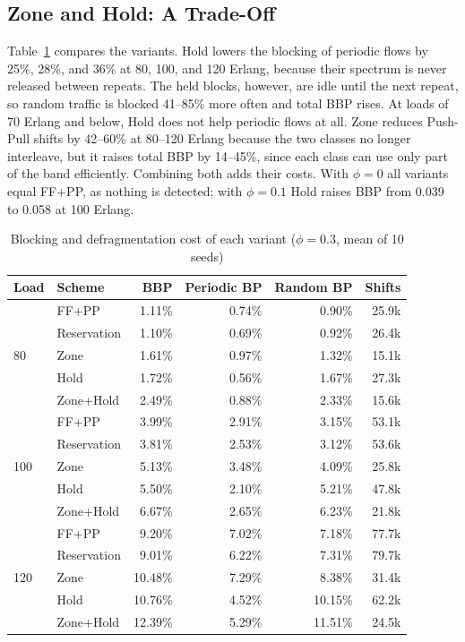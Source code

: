 \documentclass[conference]{IEEEtran}
\begin{document}
\subsection{Zone and Hold: A Trade-Off}
Table~\ref{tab:variants} compares the variants. Hold lowers the blocking of periodic flows by 25\%, 28\%, and 36\% at 80, 100, and 120 Erlang, because their spectrum is never released between repeats. The held blocks, however, are idle until the next repeat, so random traffic is blocked 41--85\% more often and total BBP rises. At loads of 70 Erlang and below, Hold does not help periodic flows at all. Zone reduces Push-Pull shifts by 42--60\% at 80--120 Erlang because the two classes no longer interleave, but it raises total BBP by 14--45\%, since each class can use only part of the band efficiently. Combining both adds their costs. With $\phi=0$ all variants equal FF+PP, as nothing is detected; with $\phi=0.1$ Hold raises BBP from 0.039 to 0.058 at 100 Erlang.

\begin{table}[t]
\centering
\caption{Blocking and defragmentation cost of each variant ($\phi=0.3$, mean of 10 seeds)}
\label{tab:variants}
\small
\setlength{\tabcolsep}{4pt}
\begin{tabular}{@{}llrrrr@{}}
\toprule
Load & Scheme & BBP & Periodic BP & Random BP & Shifts \\
\midrule
\multirow{5}{*}{80} & FF+PP & 1.11\% & 0.74\% & 0.90\% & 25.9k \\
 & Reservation & 1.10\% & 0.69\% & 0.92\% & 26.4k \\
 & Zone & 1.61\% & 0.97\% & 1.32\% & 15.1k \\
 & Hold & 1.72\% & 0.56\% & 1.67\% & 27.3k \\
 & Zone+Hold & 2.49\% & 0.88\% & 2.33\% & 15.6k \\
\midrule
\multirow{5}{*}{100} & FF+PP & 3.99\% & 2.91\% & 3.15\% & 53.1k \\
 & Reservation & 3.81\% & 2.53\% & 3.12\% & 53.6k \\
 & Zone & 5.13\% & 3.48\% & 4.09\% & 25.8k \\
 & Hold & 5.50\% & 2.10\% & 5.21\% & 47.8k \\
 & Zone+Hold & 6.67\% & 2.65\% & 6.23\% & 21.8k \\
\midrule
\multirow{5}{*}{120} & FF+PP & 9.20\% & 7.02\% & 7.18\% & 77.7k \\
 & Reservation & 9.01\% & 6.22\% & 7.31\% & 79.7k \\
 & Zone & 10.48\% & 7.29\% & 8.38\% & 31.4k \\
 & Hold & 10.76\% & 4.52\% & 10.15\% & 62.2k \\
 & Zone+Hold & 12.39\% & 5.29\% & 11.51\% & 24.5k \\
\bottomrule
\end{tabular}
\end{table}
\end{document}
